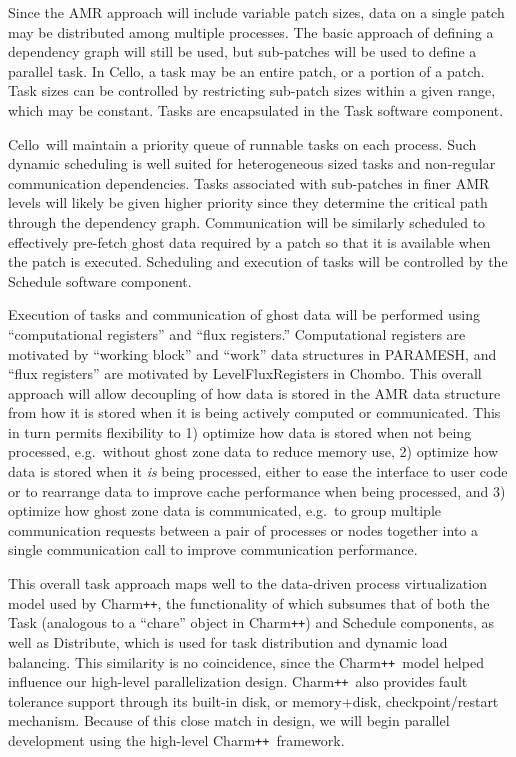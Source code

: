 \documentclass[11pt,letterpaper]{article}
\newcommand{\cello}{\textsf{Cello}}
\newcommand{\pp}{\texttt{++}}
\newcommand{\charm}{\textsf{Charm\pp}}
\newcommand{\chombo}{\textsf{Chombo}}
\newcommand{\paramesh}{\textsf{PARAMESH}}
\newcommand{\code}[1]{\textsf{#1}}
\begin{document}
Since the AMR approach will include variable patch sizes, data on a
single patch may be distributed among multiple processes.  The basic
approach of defining a dependency graph will still be used, but
sub-patches will be used to define a parallel task.  In \cello, a task
may be an entire patch, or a portion of a patch.  Task sizes can be
controlled by restricting sub-patch sizes within a given range, which
may be constant.  Tasks are encapsulated in the \code{Task} software
component.

\cello\ will maintain a priority queue of runnable tasks on each
process.  Such dynamic scheduling is well suited for heterogeneous
sized tasks and non-regular communication dependencies. Tasks
associated with sub-patches in finer AMR levels will likely be given
higher priority since they determine the critical path through the
dependency graph.  Communication will be similarly scheduled to
effectively pre-fetch ghost data required by a patch so that it is
available when the patch is executed.  Scheduling and execution of
tasks will be controlled by the \code{Schedule} software component.

Execution of tasks and communication of ghost data will be performed
using ``computational registers'' and ``flux registers.''
Computational registers are motivated by ``working block'' and
``work'' data structures in \paramesh, and ``flux registers'' are
motivated by \code{LevelFluxRegister}s in \chombo.  This overall
approach will allow decoupling of how data is stored in the AMR data
structure from how it is stored when it is being actively computed or
communicated.  This in turn permits flexibility to 1) optimize how
data is stored when not being processed, e.g.~without ghost zone data
to reduce memory use, 2) optimize how data is stored when it
\textit{is} being processed, either to ease the interface to user code
or to rearrange data to improve cache performance when being
processed, and 3) optimize how ghost zone data is communicated,
e.g.~to group multiple communication requests between a pair of
processes or nodes together into a single communication call to
improve communication performance.

This overall task approach maps well to the data-driven process
virtualization model used by \charm, the functionality of which
subsumes that of both the \code{Task} (analogous to a ``chare'' object
in \charm) and \code{Schedule} components, as well as
\code{Distribute}, which is used for task distribution and dynamic
load balancing.  This similarity is no coincidence, since the \charm\
model helped influence our high-level parallelization design.  \charm\
also provides fault tolerance support through its built-in disk, or
memory+disk, checkpoint/restart mechanism.  Because of this close
match in design, we will begin parallel development using the
high-level \charm\ framework.
\end{document}

